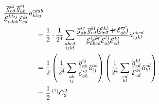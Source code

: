 \documentclass[11pt]{article}
\begin{document}
\begin{enumerate}
\begin{align*}
{  \ensuremath{\frac {\overline{g}_{cd}^{kl}\,\overline{g}_{ab}^{ij}}{\mathcal{E}_{cdab}^{klij}\mathcal{E}_{cd}^{kl}}}
  \ensuremath{\tilde}{a}^{cdab}_{klij}
}
\\=&\
  \frac {1}{2}
  \cdot
  \frac {1}{2^4}
  \sum_{\substack{abcd\\ijkl}}
  \frac {
    \overline{g}_{ab}^{ij}\,
    \overline{g}_{cd}^{kl}
    (\cancel{
      \mathcal{E}_{cd}^{kl}
    +
      \mathcal{E}_{ab}^{ij}
    })
  }{
    \cancel{\mathcal{E}_{abcd}^{ijkl}}
    \mathcal{E}_{ab}^{ij}
    \mathcal{E}_{cd}^{kl}
  }
  \tilde{a}^{abcd}_{ijkl}
\\=&\
\frac {1}{2}
\left(
  \frac {1}{2^4}
  \sum_{\substack{ab\\ij}}
  \frac {
    \overline{g}_{ab}^{ij}
  }{
    \mathcal{E}_{ab}^{ij}
  }
  \tilde{a}^{ab}_{ij}
\right)
\left(
  \frac {1}{2^4}
  \sum_{\substack{cd\\kl}}
  \frac {
    \overline{g}_{cd}^{kl}
  }{
    \mathcal{E}_{cd}^{kl}
  }
  \tilde{a}^{cd}_{kl}
\right)\\=&\
  \frac {1}{2}
  \,{}^{(1)}C_2^2
\end{align*}

\end{enumerate}
\end{document}
